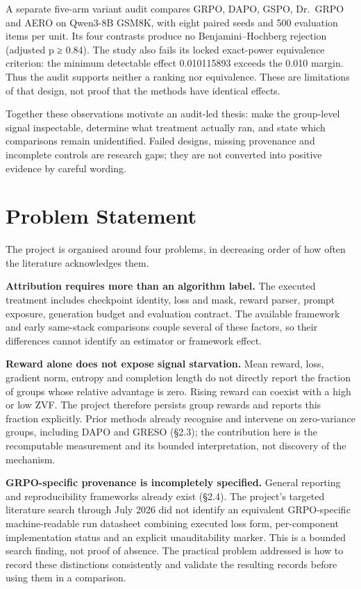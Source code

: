 \documentclass[12pt,a4paper]{report}
\begin{document}
A separate five-arm variant audit compares GRPO, DAPO, GSPO, Dr.~GRPO
and AERO on Qwen3-8B GSM8K, with eight paired seeds and 500 evaluation
items per unit. Its four contrasts produce no Benjamini--Hochberg
rejection (adjusted p ≥ 0.84). The study also fails its locked
exact-power equivalence criterion: the minimum detectable effect
0.010115893 exceeds the 0.010 margin. Thus the audit supports neither a
ranking nor equivalence. These are limitations of that design, not proof
that the methods have identical effects.

Together these observations motivate an audit-led thesis: make the
group-level signal inspectable, determine what treatment actually ran,
and state which comparisons remain unidentified. Failed designs, missing
provenance and incomplete controls are research gaps; they are not
converted into positive evidence by careful wording.

\section{Problem Statement}\label{problem-statement}

The project is organised around four problems, in decreasing order of
how often the literature acknowledges them.

\textbf{Attribution requires more than an algorithm label.} The executed
treatment includes checkpoint identity, loss and mask, reward parser,
prompt exposure, generation budget and evaluation contract. The
available framework and early same-stack comparisons couple several of
these factors, so their differences cannot identify an estimator or
framework effect.

\textbf{Reward alone does not expose signal starvation.} Mean reward,
loss, gradient norm, entropy and completion length do not directly
report the fraction of groups whose relative advantage is zero. Rising
reward can coexist with a high or low ZVF. The project therefore
persists group rewards and reports this fraction explicitly. Prior
methods already recognise and intervene on zero-variance groups,
including DAPO and GRESO (§2.3); the contribution here is the
recomputable measurement and its bounded interpretation, not discovery
of the mechanism.

\textbf{GRPO-specific provenance is incompletely specified.} General
reporting and reproducibility frameworks already exist (§2.4). The
project's targeted literature search through July 2026 did not identify
an equivalent GRPO-specific machine-readable run datasheet combining
executed loss form, per-component implementation status and an explicit
unauditability marker. This is a bounded search finding, not proof of
absence. The practical problem addressed is how to record these
distinctions consistently and validate the resulting records before
using them in a comparison.
\end{document}
